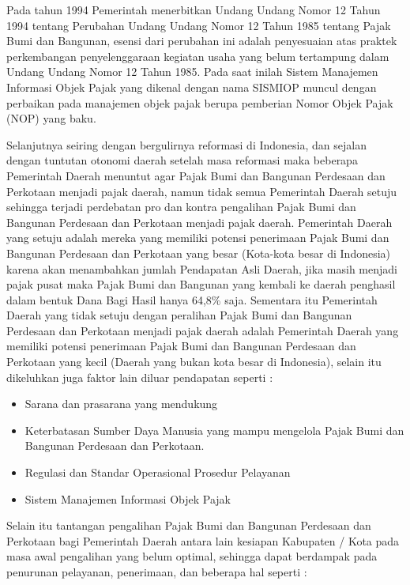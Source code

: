 \documentclass[pdftex,12pt, oneside]{article}
\begin{document}
Pada tahun 1994 Pemerintah menerbitkan Undang Undang Nomor 12 Tahun 1994 tentang Perubahan Undang Undang Nomor 12 Tahun 1985 tentang Pajak Bumi dan Bangunan, esensi dari perubahan ini adalah penyesuaian atas praktek perkembangan penyelenggaraan kegiatan usaha yang belum tertampung dalam Undang Undang Nomor 12 Tahun 1985. Pada saat inilah Sistem Manajemen Informasi Objek Pajak yang dikenal dengan nama SISMIOP muncul dengan perbaikan pada manajemen objek pajak berupa pemberian Nomor Objek Pajak (NOP) yang baku.

Selanjutnya seiring dengan bergulirnya reformasi di Indonesia, dan sejalan dengan tuntutan otonomi daerah setelah masa reformasi maka beberapa Pemerintah Daerah menuntut agar Pajak Bumi dan Bangunan Perdesaan dan Perkotaan menjadi pajak daerah, namun tidak semua Pemerintah Daerah setuju sehingga terjadi perdebatan pro dan kontra pengalihan Pajak Bumi dan Bangunan Perdesaan dan Perkotaan menjadi pajak daerah. Pemerintah Daerah yang setuju adalah mereka yang memiliki potensi penerimaan Pajak Bumi dan Bangunan Perdesaan dan Perkotaan yang besar (Kota-kota besar di Indonesia) karena akan menambahkan jumlah Pendapatan Asli Daerah, jika masih menjadi pajak pusat maka Pajak Bumi dan Bangunan yang kembali ke daerah penghasil dalam bentuk Dana Bagi Hasil hanya 64,8\% saja. Sementara itu Pemerintah Daerah yang tidak setuju dengan peralihan Pajak Bumi dan Bangunan Perdesaan dan Perkotaan menjadi pajak daerah adalah Pemerintah Daerah yang memiliki potensi penerimaan Pajak Bumi dan Bangunan Perdesaan dan Perkotaan yang kecil (Daerah yang bukan kota besar di Indonesia), selain itu dikeluhkan juga faktor lain diluar pendapatan seperti :

\begin{itemize}

	\item Sarana dan prasarana yang mendukung
	
	\item Keterbatasan Sumber Daya Manusia yang mampu mengelola Pajak Bumi dan Bangunan Perdesaan dan Perkotaan.
	
	\item Regulasi dan Standar Operasional Prosedur Pelayanan
	
	\item Sistem Manajemen Informasi Objek Pajak

\end{itemize}

Selain itu tantangan pengalihan Pajak Bumi dan Bangunan Perdesaan dan Perkotaan bagi Pemerintah Daerah antara lain kesiapan Kabupaten / Kota pada masa awal pengalihan yang belum optimal, sehingga dapat berdampak pada penurunan pelayanan, penerimaan, dan beberapa hal seperti : 
\end{document}
